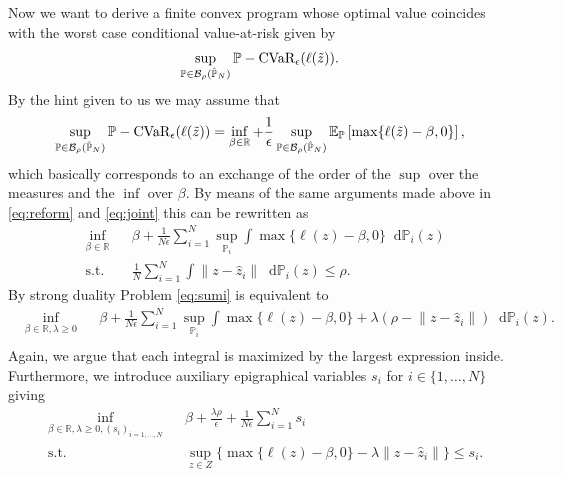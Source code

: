 \documentclass{scrartcl}
\newcommand*\diff{\mathop{}\!\mathrm{d}}
\renewcommand{\P}{\mathbb{P}}
\newcommand{\E}{\mathbb{E}}
\newcommand{\R}{\mathbb{R}}
\newcommand{\ball}{\mathcal{B}}
\newcommand{\cvar}{\textup{CVaR}}
\begin{document}
Now we want to derive a finite convex program whose optimal value coincides with
the worst case conditional value-at-risk given by
\begin{equation}
  \label{eq:op_two}
  \begin{aligned}
    \sup_{\P \in \ball_{\rho}(\hat{\P}_{N})} \P-\cvar_{\epsilon}( \ell(\tilde{z}) ). 
  \end{aligned}
\end{equation}
By the hint given to us we may assume that
\begin{equation}
  \label{eq:op_hint}
  \begin{aligned}
    \sup_{\P \in \ball_{\rho}(\hat{\P}_{N})} \P-\cvar_{\epsilon}( \ell(\tilde{z}) ) = \inf_{\beta \in \R} + \frac{1}{\epsilon} \sup_{\P \in \ball_{\rho}(\hat{\P}_{N})} \E_{\P} \left[ \max\{ \ell (\tilde{z}) - \beta, 0 \} \right],
  \end{aligned}
\end{equation}
which basically corresponds to an exchange of the order of the $\sup$ over the
measures and the $\inf$ over $\beta$.
By means of the same arguments made above in \eqref{eq:reform} and
\eqref{eq:joint} this can be rewritten as
\begin{equation}
  \label{eq:sumi}
  \begin{aligned}
  & \inf_{\beta \in \R} & & \beta + \frac{1}{N\epsilon} \sum_{i=1}^N \sup_{\P_i} \int \max\{ \ell (z) - \beta, 0 \} \diff \P_i(z) \\
  & \text{s.t.} & & \frac{1}{N} \sum_{i=1}^N \int \lVert z-\hat{z}_i  \rVert \diff \P_i(z) \le \rho.
  \end{aligned}
\end{equation}
By strong duality Problem \eqref{eq:sumi} is equivalent to
\begin{equation}
  \label{eq:duality}
  \begin{aligned}
  & \inf_{\beta \in \R, \lambda\geq0} & & \beta + \frac{1}{N\epsilon} \sum_{i=1}^N \sup_{\P_i} \int \max\{ \ell (z) - \beta, 0 \} + \lambda (\rho - \lVert z-\hat{z}_i  \rVert) \diff \P_i(z). \\
  \end{aligned}
\end{equation}
Again, we argue that each integral is maximized by the largest expression
inside. Furthermore, we introduce auxiliary epigraphical variables $s_i$ for $i
\in \{1,\dots,N\}$ giving
\begin{equation}
  \label{eq:sup}
  \begin{aligned}
    & \inf_{\beta \in \R, \lambda\geq0, (s_i)_{i=1,\dots,N}} & & \beta + \frac{\lambda\rho}{\epsilon} + \frac{1}{N\epsilon} \sum_{i=1}^N s_i \\
    & \text{s.t.} & & \sup_{z \in Z}\{ \max\{ \ell (z) - \beta, 0 \} - \lambda \lVert z-\hat{z}_i  \rVert \} \le s_i.
  \end{aligned}
\end{equation}
\end{document}
